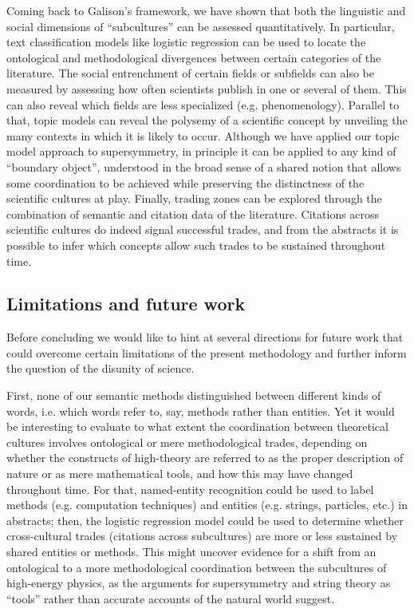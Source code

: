 \documentclass[smallextended]{svjour3}
\begin{document}
Coming back to Galison's framework, we have shown that both the linguistic and social dimensions of ``subcultures'' can be assessed quantitatively. In particular, text classification models like logistic regression can be used to locate the ontological and methodological divergences between certain categories of the literature. The social entrenchment of certain fields or subfields can also be measured by assessing how often scientists publish in one or several of them. This can also reveal which fields are less specialized (e.g. phenomenology). Parallel to that, topic models can reveal the polysemy of a scientific concept by unveiling the many contexts in which it is likely to occur. Although we have applied our topic model approach to supersymmetry, in principle it can be applied to any kind of ``boundary object'', understood in the broad sense of a shared notion that allows some coordination to be achieved while preserving the distinctness of the scientific cultures at play. Finally, trading zones can be explored through the combination of semantic and citation data of the literature. Citations across scientific cultures do indeed signal successful trades, and from the abstracts it is possible to infer which concepts allow such trades to be sustained throughout time.  

\subsection{Limitations and future work}

Before concluding we would like to hint at several directions for future work that could overcome certain limitations of the present methodology and further inform the question of the disunity of science.

First, none of our semantic methods distinguished between different kinds of words, i.e. which words refer to, say, methods rather than entities. Yet it would be interesting to evaluate to what extent the coordination between theoretical cultures involves ontological or mere methodological trades, depending on whether the constructs of high-theory are referred to as the proper description of nature or as mere mathematical tools, and how this may have changed throughout time. For that, named-entity recognition could be used to label methods (e.g. computation techniques) and entities (e.g. strings, particles, etc.) in abstracts; then, the logistic regression model could be used to determine whether cross-cultural trades (citations across subcultures) are more or less sustained by shared entities or methods. This might uncover evidence for a shift from an ontological to a more methodological coordination between the subcultures of high-energy physics, as the arguments for supersymmetry and string theory as ``tools'' rather than accurate accounts of the natural world suggest.
\end{document}
